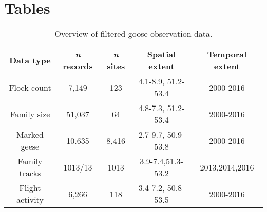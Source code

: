 \section{Tables}\label{tables}

\begin{table*}
\begin{tabular}{|c|c|c|c|c|}
\hline 
Data type & \emph{n} records & \emph{n} sites & Spatial extent & Temporal extent\tabularnewline
\hline 
\hline 
Flock count & 7,149 & 123 & 4.1-8.9, 51.2-53.4 & 2000-2016\tabularnewline
\hline 
Family size & 51,037 & 64 & 4.8-7.3, 51.2-53.4 & 2000-2016\tabularnewline
\hline 
Marked geese & 10.635 & 8,416 & 2.7-9.7, 50.9-53.8 & 2000-2016\tabularnewline
\hline 
Family tracks & 1013/13 & 1013 & 3.9-7.4,51.3-53.2 & 2013,2014,2016\tabularnewline
\hline 
Flight activity & 6,266 & 118 & 3.4-7.2, 50.8-53.5 & 2000-2016\tabularnewline
\hline 
\end{tabular}

\caption{Overview of filtered goose observation data.}

\end{table*}

